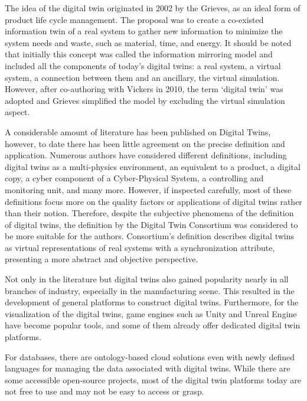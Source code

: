 \documentclass[conference]{IEEEtran}
\begin{document}
    
    The idea of the digital twin originated in 2002 by the Grieves, as an ideal form of product life cycle management. 
    The proposal was to create a co-existed information twin of a real system to gather new information to minimize 
    the system needs and waste, such as material, time, and energy. It should be noted that initially this concept was 
    called the information mirroring model and included all the components of today's digital twins: a real system, 
    a virtual system, a connection between them and an ancillary, the virtual simulation. However, after co-authoring with Vickers in 2010, 
    the term `digital twin' was adopted and Grieves simplified the model by excluding the virtual simulation aspect.
    
    A considerable amount of literature has been published on Digital Twins, however, to date there has been little agreement on the precise definition and application. Numerous authors have considered different 
    definitions, including digital twins as a multi-physics environment, an equivalent to a product, a digital copy, a cyber component of a Cyber-Physical System, a controlling and monitoring unit,
    and many more. However, if inspected carefully, most of these definitions focus more on the quality factors or applications of digital twins rather than their notion.
    Therefore, despite the subjective phenomena of the definition of digital twins, the definition by the Digital Twin Consortium was considered to be more suitable for the authors. 
    Consortium's definition describes digital twins as virtual representations of real systems with a synchronization attribute,
    presenting a more abstract and objective perspective.\cite{asf}

    Not only in the literature but digital twins also gained popularity nearly in all branches of industry, especially in the manufacturing scene.  
    This resulted in the development of general platforms to construct digital twins. Furthermore, for the visualization of the digital twins, 
    game engines such as Unity and  Unreal Engine have become popular tools, and some of them already offer dedicated digital 
    twin platforms. 
    
    For databases, there are ontology-based cloud solutions even with newly defined languages for 
    managing the data associated with digital twins. While there are some accessible open-source projects, 
    most of the digital twin platforms today are not free to use and may not be easy to access or grasp. 
\end{document}
